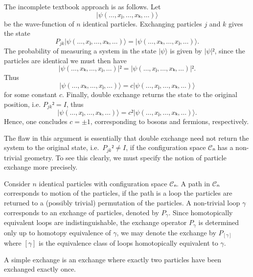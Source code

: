 \begin{example}\label{ex:crude exchange}
  The incomplete textbook approach is as follows. Let
  \begin{equation}
    |ψ(…,xⱼ,…,xₖ,…)⟩
  \end{equation}
  be the wave-function of $n$ identical particles. Exchanging particles $j$ and $k$ gives the state
  \begin{equation}
    P_{jk} |ψ(…,xⱼ,…,xₖ,…)⟩ = |ψ(…,xₖ,…,xⱼ,…)⟩.
  \end{equation}
  The probability of measuring a system in the state $|ψ⟩$ is given by $|ψ|²$, since the particles are identical we must then have
  \begin{equation}
    |ψ(…,xₖ,…,xⱼ,…)|² = |ψ(…,xⱼ,…,xₖ,…)|².
  \end{equation}
  Thus
  \begin{equation}
    |ψ(…,xₖ,…,xⱼ,…)⟩ = c |ψ(…,xⱼ,…,xₖ,…)⟩
  \end{equation}
  for some constant $c$. Finally, double exchange returns the state to the original position, i.e. $P_{jk}² = I$, thus
  \begin{equation}
    |ψ(…,xⱼ,…,xₖ,…)⟩ = c² |ψ(…,xⱼ,…,xₖ,…)⟩.
  \end{equation}
  Hence, one concludes $c = ±1$, corresponding to bosons and fermions, respectively.
\end{example}

The flaw in this argument is essentially that double exchange need not return the system to the original state, i.e.\ $P_{jk}² ≠ I$, if the configuration space $𝒞ₙ$ has a non-trivial geometry. To see this clearly, we must specify the notion of particle exchange more precisely.

\begin{definition}[Exchange]
  Consider $n$ identical particles with configuration space $𝒞ₙ$. A path in $𝒞ₙ$ corresponds to motion of the particles, if the path is a loop the particles are returned to a (possibly trivial) permutation of the particles. A non-trivial loop $γ$ corresponds to an exchange of particles, denoted by $P_γ$. Since homotopically equivalent loops are indistinguishable, the exchange operator $P_γ$ is determined only up to homotopy equivalence of $γ$, we may denote the exchange by $P_{[γ]}$ where $[γ]$ is the equivalence class of loops homotopically equivalent to $γ$.
\end{definition}

\begin{definition}
  A simple exchange is an exchange where exactly two particles have been exchanged exactly once.
\end{definition}

